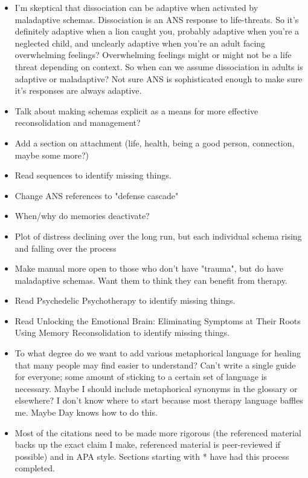 \documentclass[12pt,letterpaper]{article}
\begin{document}
\begin{itemize}
    \item I'm skeptical that dissociation can be adaptive when activated by maladaptive schemas. Dissociation is an ANS response to life-threats. So it's definitely adaptive when a lion caught you, probably adaptive when you're a neglected child, and unclearly adaptive when you're an adult facing overwhelming feelings? Overwhelming feelings might or might not be a life threat depending on context. So when can we assume dissociation in adults is adaptive or maladaptive? Not sure ANS is sophisticated enough to make sure it's responses are always adaptive.
    \item Talk about making schemas explicit as a means for more effective reconsolidation and management?
    \item Add a section on attachment (life, health, being a good person, connection, maybe some more?)
    \item Read sequences to identify missing things.
    \item Change ANS references to "defense cascade"
    \item When/why do memories deactivate?
    \item Plot of distress declining over the long run, but each individual schema rising and falling over the process
    \item Make manual more open to those who don't have "trauma", but do have maladaptive schemas. Want them to think they can benefit from therapy.
    \item Read Psychedelic Psychotherapy to identify missing things.
    \item Read Unlocking the Emotional Brain: Eliminating Symptoms at Their Roots Using Memory Reconsolidation to identify missing things.
    \item To what degree do we want to add various metaphorical language for healing that many people may find easier to understand? Can't write a single guide for everyone; some amount of sticking to a certain set of language is necessary. Maybe I should include metaphorical synonyms in the glossary or elsewhere? I don't know where to start because most therapy language baffles me. Maybe Day knows how to do this.
    \item Most of the citations need to be made more rigorous (the referenced material backs up the exact claim I make, referenced material is peer-reviewed if possible) and in APA style. Sections starting with * have had this process completed.
\end{itemize}
\end{document}
